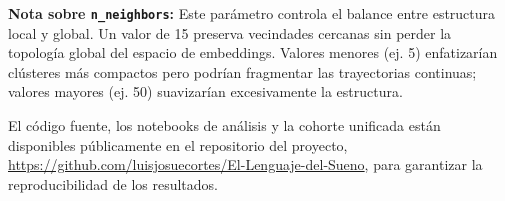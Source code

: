 \textbf{Nota sobre \texttt{n\_neighbors}:} Este parámetro controla el balance entre estructura local y global. Un valor de 15 preserva vecindades cercanas sin perder la topología global del espacio de embeddings. Valores menores (ej. 5) enfatizarían clústeres más compactos pero podrían fragmentar las trayectorias continuas; valores mayores (ej. 50) suavizarían excesivamente la estructura.

El código fuente, los notebooks de análisis y la cohorte unificada están disponibles públicamente en el repositorio del proyecto, \url{https://github.com/luisjosuecortes/El-Lenguaje-del-Sueno}, para garantizar la reproducibilidad de los resultados.
